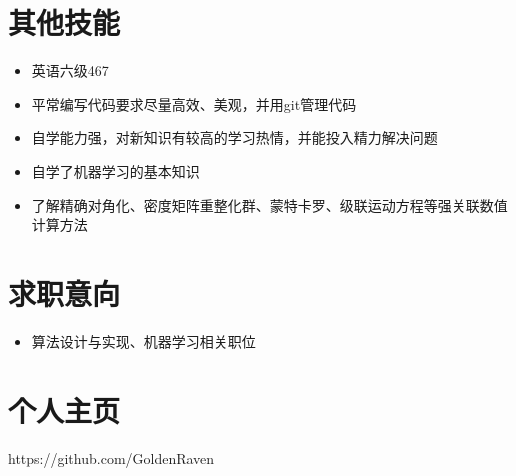 \documentclass{resume}
\begin{document}
\section{其他技能}
\begin{itemize}%
\item 英语六级467
\item 平常编写代码要求尽量高效、美观，并用git管理代码
\item 自学能力强，对新知识有较高的学习热情，并能投入精力解决问题
\item 自学了机器学习的基本知识
\item 了解精确对角化、密度矩阵重整化群、蒙特卡罗、级联运动方程等强关联数值计算方法
\end{itemize}

\section{求职意向}
\begin{itemize}[parsep=0.5ex]
\item 算法设计与实现、机器学习相关职位
\end{itemize}
\section{个人主页}
\rm{https://github.com/GoldenRaven}

%  
\end{document}
